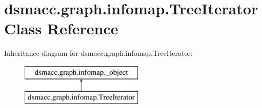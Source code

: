 \hypertarget{classdsmacc_1_1graph_1_1infomap_1_1TreeIterator}{}\section{dsmacc.\+graph.\+infomap.\+Tree\+Iterator Class Reference}
\label{classdsmacc_1_1graph_1_1infomap_1_1TreeIterator}
Inheritance diagram for dsmacc.\+graph.\+infomap.\+Tree\+Iterator\+:\begin{figure}[H]
\begin{center}
\leavevmode
\includegraphics[height=2.000000cm]{classdsmacc_1_1graph_1_1infomap_1_1TreeIterator}
\end{center}
\end{figure}
